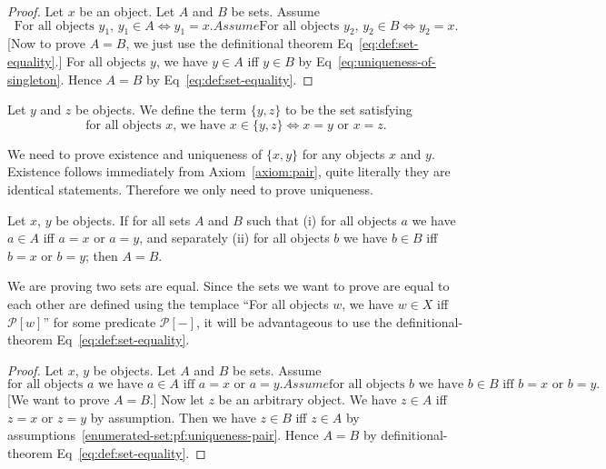 \begin{proof}
Let $x$ be an object. Let $A$ and $B$ be sets. Assume
\begin{subequations}\label{eq:uniqueness-of-singleton}
\begin{equation}
\mbox{For all objects $y_{1}$, }y_{1}\in A\iff y_{1}=x.
\end{equation}
Assume
\begin{equation}
\mbox{For all objects $y_{2}$, }y_{2}\in B\iff y_{2}=x.
\end{equation}
\end{subequations}
[Now to prove $A=B$, we just use the definitional theorem Eq~\eqref{eq:def:set-equality}.]
For all objects $y$, we have $y\in A$ iff $y\in B$ by Eq~\eqref{eq:uniqueness-of-singleton}.
Hence $A=B$ by Eq~\eqref{eq:def:set-equality}.
\end{proof}

\begin{definition}
Let $y$ and $z$ be objects. We define the term $\{y,z\}$ to be the set
satisfying
\begin{equation}\label{enum:def:unordered-pair}
\mbox{for all objects $x$, we have }x\in\{y,z\}\iff x=y\mbox{ or }x=z.
\end{equation}
\end{definition}

We need to prove existence and uniqueness of $\{x,y\}$ for any objects
$x$ and $y$. Existence follows immediately from Axiom~\ref{axiom:pair},
quite literally they are identical statements. Therefore we only need to
prove uniqueness.

\begin{theorem}[Uniqueness]
Let $x$, $y$ be objects. If for all sets $A$ and $B$ such that
(i) for all objects $a$ we have $a\in A$ iff $a=x$ or $a=y$, and
separately (ii) for all objects $b$ we have $b\in B$ iff $b=x$ or $b=y$;
then $A=B$.
\end{theorem}

We are proving two sets are equal. Since the sets we want to prove are
equal to each other are defined using the templace ``For all objects $w$,
we have $w\in X$ iff $\mathcal{P}[w]$'' for some predicate $\mathcal{P}[-]$,
it will be advantageous to use the definitional-theorem Eq~\eqref{eq:def:set-equality}.

\begin{proof}
Let $x$, $y$ be objects. Let $A$ and $B$ be sets. Assume
\begin{subequations}\label{enumerated-set:pf:uniqueness-pair}
\begin{equation}
\mbox{for all objects $a$ we have $a\in A$ iff $a=x$ or $a=y$}.
\end{equation}
Assume
\begin{equation}
\mbox{for all objects $b$ we have $b\in B$ iff $b=x$ or $b=y$}.
\end{equation}
\end{subequations}
[We want to prove $A=B$.]
Now let $z$ be an arbitrary object. We have $z\in A$ iff $z=x$ or $z=y$
by assumption.
Then we have $z\in B$ iff $z\in A$ by assumptions~\eqref{enumerated-set:pf:uniqueness-pair}.
Hence $A=B$ by definitional-theorem Eq~\eqref{eq:def:set-equality}.
\end{proof}

